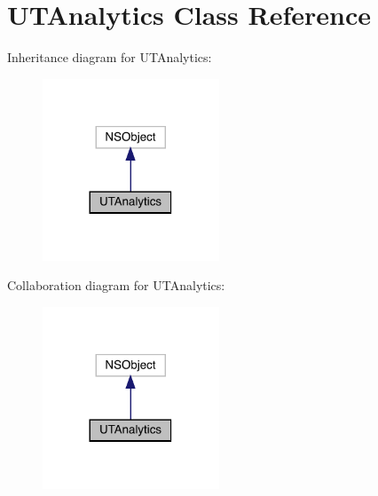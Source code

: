 \hypertarget{interface_u_t_analytics}{}\section{U\+T\+Analytics Class Reference}
\label{interface_u_t_analytics}


Inheritance diagram for U\+T\+Analytics\+:\nopagebreak
\begin{figure}[H]
\begin{center}
\leavevmode
\includegraphics[width=149pt]{interface_u_t_analytics__inherit__graph}
\end{center}
\end{figure}


Collaboration diagram for U\+T\+Analytics\+:\nopagebreak
\begin{figure}[H]
\begin{center}
\leavevmode
\includegraphics[width=149pt]{interface_u_t_analytics__coll__graph}
\end{center}
\end{figure}
